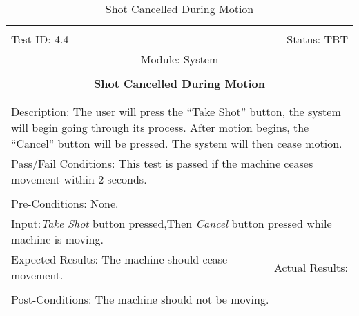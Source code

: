 \documentclass[titlepage]{article}
\begin{document}
\begin{center}%
\begin{table}[h!]
\begin{tabular}{|l r|}\hline&\\[-2mm]
	Test ID: 4.4	&Status: TBT\\[-3mm]
	\multicolumn{2}{|c|}{Module: System}\\&\\
	\multicolumn{2}{|c|}{\textbf{\large{Shot Cancelled During Motion}}}\\&\\\hline&\\[-3mm]
	\multicolumn{2}{|p{\textwidth}|}{Description: The user will press the ``Take Shot'' button, the system will begin going through its process. After motion begins, the ``Cancel'' button will be pressed. The system will then cease motion.}\\\hline
	\multicolumn{2}{|p{\textwidth}|}{Pass/Fail Conditions: This test is passed if the machine ceases movement within 2 seconds.}\\[1mm]\hline&\\[-3mm]
	\multicolumn{2}{|p{\textwidth}|}{Pre-Conditions: None.}\\[4mm]
	\multicolumn{2}{|p{\textwidth}|}{Input:\newline\textit{Take Shot} button pressed,\newline Then \textit{Cancel} button pressed while machine is moving.}\\[2mm]\hline
	\multicolumn{1}{|p{0.49\textwidth}}{Expected Results: The machine should cease movement.}	&\multicolumn{1}{|p{0.45\textwidth}|}{Actual Results: }\\\hline&\\[-3mm]
	\multicolumn{2}{|p{\textwidth}|}{Post-Conditions: The machine should not be moving.}\\\hline
\end{tabular}
\caption{Shot Cancelled During Motion}
\end{table}
\end{center}
\newpage
\end{document}
